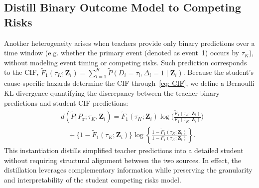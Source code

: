 \documentclass{article}
\theoremstyle{plain}
\theoremstyle{definition}
\theoremstyle{remark}
\begin{document}
\subsection{Distill Binary Outcome Model to Competing Risks}
\label{sec.binary}
Another heterogeneity arises when teachers provide only binary predictions over a time window (e.g. whether the primary event (denoted as event~1) occurs by \(\tau_K\)), without modeling event timing or competing risks. Such prediction corresponds to the CIF,
    $\tilde{F}_1(\tau_K; \bm{Z}_i) = 
    \sum_{l=1}^K \tilde{P}(D_i=\tau_l, \Delta_i=1 \mid \bm{Z}_i)$.  
Because the student’s cause-specific hazards determine the CIF through~\eqref{eq: CIF}, we define a Bernoulli KL divergence quantifying the discrepancy between the teacher binary predictions and student CIF predictions:
\begin{eqnarray*}
 & d(\tilde{P} \Vert  P_{\boldsymbol r}; \tau_K, \bm{Z}_i) = \tilde{F}_{1}(\tau_K; \bm{Z}_{i}) \log\!\Biggl(\frac{\tilde{F}_{1}(\tau_K; \bm{Z}_{i})}{F_{1}(\tau_K;\bm{Z}_{i})}\Biggl) \\
&\quad +\{1-\tilde{F}_{1}(\tau_K; \bm{Z}_{i})\} \log\left\{\frac{1-\tilde{F}_{1}(\tau_K; \bm{Z}_{i})}{1-F_{1}(\tau_K;\bm{Z}_{i})}\right\}.
\end{eqnarray*}
This instantiation distills simplified teacher predictions into a detailed student without  requiring structural alignment between the two sources.
In effect, the distillation leverages complementary information while preserving the granularity and interpretability of the student competing risks model.
\end{document}
